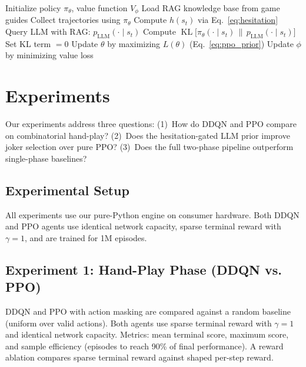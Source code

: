 \documentclass[conference]{IEEEtran}
\DeclareMathOperator{\KL}{KL}
\begin{document}
\begin{algorithm}[t]
\caption{Hesitation-Gated PPO with LLM Prior}
\label{alg:hg_ppo}
\begin{algorithmic}[1]
\STATE Initialize policy $\pi_\theta$, value function $V_\phi$
\STATE Load RAG knowledge base from game guides
    \STATE Collect trajectories using $\pi_\theta$
        \STATE Compute $h(s_t)$ via Eq.~\ref{eq:hesitation}
            \STATE Query LLM with RAG: $p_{\mathrm{LLM}}(\cdot \mid s_t)$
            \STATE Compute $\KL\bigl[\pi_\theta(\cdot \mid s_t) \,\big\|\, p_{\mathrm{LLM}}(\cdot \mid s_t)\bigr]$
        \ELSE
            \STATE Set KL term $= 0$
        \ENDIF
    \ENDFOR
    \STATE Update $\theta$ by maximizing $L(\theta)$ (Eq.~\ref{eq:ppo_prior})
    \STATE Update $\phi$ by minimizing value loss
\ENDFOR
\end{algorithmic}
\end{algorithm}

\section{Experiments}
\label{sec:results}

Our experiments address three questions: (1)~How do DDQN and PPO compare on combinatorial hand-play? (2)~Does the hesitation-gated LLM prior improve joker selection over pure PPO? (3)~Does the full two-phase pipeline outperform single-phase baselines?

\subsection{Experimental Setup}

All experiments use our pure-Python engine on consumer hardware. Both DDQN and PPO agents use identical network capacity, sparse terminal reward with $\gamma=1$, and are trained for 1M episodes.

\subsection{Experiment 1: Hand-Play Phase (DDQN vs. PPO)}

DDQN and PPO with action masking are compared against a random baseline (uniform over valid actions).
Both agents use sparse terminal reward with $\gamma=1$ and identical network capacity.
Metrics: mean terminal score, maximum score, and sample efficiency (episodes to reach 90\% of final performance).
A reward ablation compares sparse terminal reward against shaped per-step reward.
\end{document}

